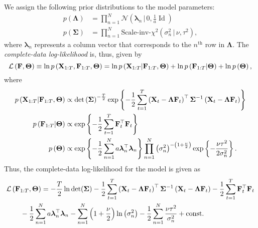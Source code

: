 We assign the following prior distributions to the model parameters:
\begin{align}
	p \left( {\bm \Lambda} \right) &= \prod_{n = 1}^N \mathcal{N} \left( {\bm \lambda}_n \,|\, 0, \frac{1}{a} \operatorname{Id} \right) \\
	p \left( {\bm \Sigma} \right) &= \prod_{n = 1}^N \text{Scale-inv-} \chi^2 \left( \sigma^2_n \,|\, \nu, \tau^2 \right),
\end{align}
where $\bm \lambda_n$ represents a column vector that corresponds to the $n^{\text{th}}$ row in $\bm \Lambda$. The \textit{complete-data log-likelihood} is, thus, given by 
\begin{equation}
	\mathcal{L} \left( {\bf F}, {\bm \Theta} \right) \equiv \ln p \left( {\bf X}_{1:T}, {\bf F}_{1:T}, {\bm \Theta} \right) = \ln p \left( {\bf X}_{1:T} | {\bf F}_{1:T}, {\bm \Theta} \right) + \ln p \left( {\bf F}_{1:T} | {\bm \Theta} \right) + \ln p \left( {\bm \Theta} \right),
\end{equation}
where 
\begin{align}
	p \left( {\bf X}_{1:T} | {\bf F}_{1:T}, {\bm \Theta} \right) &\propto \det \left( {\bf \Sigma} \right)^{-\frac{T}{2}} \exp \left\{ -\frac{1}{2} \sum_{t = 1}^T \left( {\bf X}_t - {\bm \Lambda} {\bf F}_t \right)^{\top} {\bf \Sigma}^{-1} \left( {\bf X}_t - {\bm \Lambda} {\bf F}_t \right) \right\} \\
	p \left( {\bf F}_{1:T} | {\bm \Theta} \right) &\propto \exp \left\{ -\frac{1}{2} \sum_{t = 1}^T {\bf F}_t^{\top} {\bf F}_t \right\} \\
	p \left( {\bm \Theta} \right) &\propto \exp \left\{ - \frac{1}{2} \sum_{n = 1}^N a {\bm \lambda}_n^{\top} {\bm \lambda}_n \right\} \prod_{n = 1}^N \left( \sigma^2_n \right)^{-\left( 1 + \frac{\nu}{2} \right)} \exp \left\{ -\frac{\nu \tau^2}{2\sigma^2_n} \right\}.
\end{align}
Thus, the complete-data log-likelihood for the model is given as
\begin{equation}
	\begin{split}
		\MoveEqLeft
		\mathcal{L} \left( {\bf F}_{1:T}, {\bm \Theta} \right) = - \frac{T}{2} \ln \det ({\bf \Sigma}) - \frac{1}{2} \sum_{t = 1}^T \left( {\bf X}_t - {\bm \Lambda} {\bf F}_t \right)^{\top} {\bf \Sigma}^{-1} \left( {\bf X}_t - {\bm \Lambda} {\bf F}_t \right) - \frac{1}{2} \sum_{t = 1}^T {\bf F}_t^{\top} {\bf F}_t \\&- \frac{1}{2} \sum_{n = 1}^N a {\bm \lambda}_n^{\top} {\bm \lambda}_n -\sum_{n =1}^N \left( 1 + \frac{\nu}{2} \right) \ln \left( \sigma_n^2 \right) - \frac{1}{2} \sum_{n = 1}^N \frac{\nu \tau^2}{\sigma^2_n} + \text{const}.                  
	\end{split}
\end{equation}


